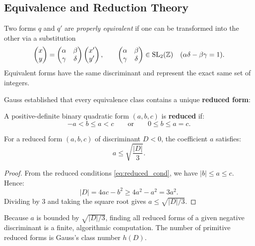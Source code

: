 \documentclass[a4paper]{article}
\begin{document}
\subsection{Equivalence and Reduction Theory}
Two forms $q$ and $q'$ are \emph{properly equivalent} if one can be transformed into the other via a substitution
\begin{equation}
 \begin{pmatrix} x \\ y \end{pmatrix} = \begin{pmatrix} \alpha & \beta \\ \gamma & \delta \end{pmatrix} \begin{pmatrix} x' \\ y' \end{pmatrix}, \qquad \begin{pmatrix} \alpha & \beta \\ \gamma & \delta \end{pmatrix} \in \mathrm{SL}_2(\mathbb{Z}) \quad (\alpha\delta - \beta\gamma = 1).
\end{equation}
Equivalent forms have the same discriminant and represent the exact same set of integers.

Gauss established that every equivalence class contains a unique \textbf{reduced form}:
\begin{definition}
A positive-definite binary quadratic form $(a, b, c)$ is \textbf{reduced} if:
\begin{equation}
 -a < b \le a < c \qquad \text{or} \qquad 0 \le b \le a = c.
 \label{eq:reduced_cond}
\end{equation}
\end{definition}

\begin{theorem}
For a reduced form $(a, b, c)$ of discriminant $D < 0$, the coefficient $a$ satisfies:
\begin{equation}
 a \le \sqrt{\frac{|D|}{3}}.
 \label{eq:gauss_bound}
\end{equation}
\end{theorem}
\begin{proof}
From the reduced conditions \eqref{eq:reduced_cond}, we have $|b| \le a \le c$. Hence:
\begin{equation}
 |D| = 4ac - b^2 \ge 4a^2 - a^2 = 3a^2.
\end{equation}
Dividing by $3$ and taking the square root gives $a \le \sqrt{|D|/3}$.
\end{proof}
Because $a$ is bounded by $\sqrt{|D|/3}$, finding all reduced forms of a given negative discriminant is a finite, algorithmic computation. The number of primitive reduced forms is Gauss's class number $h(D)$.
\end{document}
